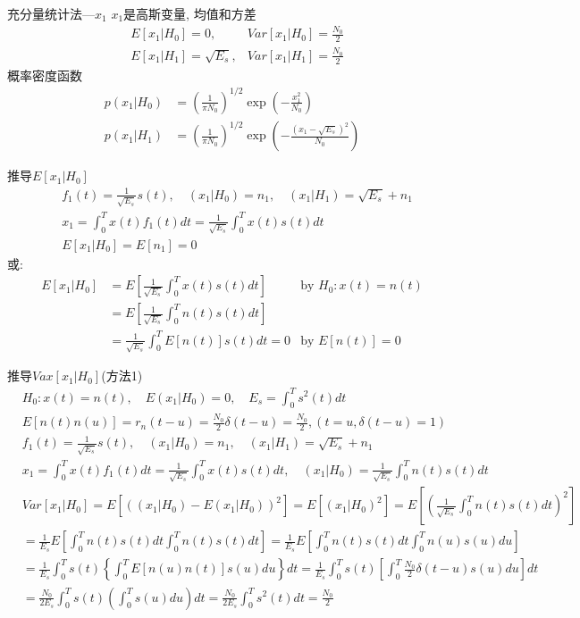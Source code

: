 \begin{frame}{充分量统计法---$x_1$}
$x_1$是高斯变量, 均值和方差
\begin{align*}
&E[x_1|H_0]=0,&Var[x_1|H_0]=\frac{N_0}{2}\\
&E[x_1|H_1]=\sqrt{E_s},&Var[x_1|H_1]=\frac{N_0}{2}
\end{align*}
概率密度函数
\begin{align*}
p(x_1|H_0)&=\left(\frac{1}{\pi N_0}\right)^{1/2}\exp\left(-\frac{x_1^2}{N_0}\right)\\
p(x_1|H_1)&=\left(\frac{1}{\pi N_0}\right)^{1/2}\exp\left(-\frac{(x_1-\sqrt{E_s})^2}{N_0}\right)
\end{align*}
\end{frame}

\begin{frame}[shrink]{推导$E[x_1|H_0]$}
\begin{align*}
&f_1(t)=\frac{1}{\sqrt{E_s}}s(t),\quad (x_1|H_0)=n_1,\quad (x_1|H_1)=\sqrt{E_s}+n_1\\ &x_1=\int_{0}^{T}x(t)f_1(t)dt=\frac{1}{\sqrt{E_s}}\int_{0}^{T}x(t)s(t)dt\\
&E[x_1|H_0]=E[n_1]=0
\end{align*}
或:
\begin{align*}
E[x_1|H_0]&=E\left[\frac{1}{\sqrt{E_s}}\int_{0}^{T}x(t)s(t)dt\right] &\text{by }H_0: x(t)=n(t)\\
&=E\left[\frac{1}{\sqrt{E_s}}\int_{0}^{T}n(t)s(t)dt\right]&\\
&=\frac{1}{\sqrt{E_s}}\int_{0}^{T}E[n(t)]s(t)dt=0 &\text{by }E[n(t)]=0
\end{align*}
\end{frame}

\begin{frame}[shrink]{推导$Vax[x_1|H_0]$(方法1)}
\begin{align*}
&H_0:x(t)=n(t),\quad E(x_1|H_0)=0,\quad E_s=\int_{0}^{T}s^2(t)dt\\
&E[n(t)n(u)]=r_n(t-u)=\frac{N_0}{2}\delta(t-u)=\frac{N_0}{2},(t=u,\delta(t-u)=1)\\
&f_1(t)=\frac{1}{\sqrt{E_s}}s(t),\quad (x_1|H_0)=n_1,\quad (x_1|H_1)=\sqrt{E_s}+n_1\\ &x_1=\int_{0}^{T}x(t)f_1(t)dt=\frac{1}{\sqrt{E_s}}\int_{0}^{T}x(t)s(t)dt,\quad (x_1|H_0)=\frac{1}{\sqrt{E_s}}\int_{0}^{T}n(t)s(t)dt
\end{align*}
\begin{align*}
&Var[x_1|H_0]=E[((x_1|H_0)-E(x_1|H_0))^2]=E[(x_1|H_0)^2]=E\left[\left(\frac{1}{\sqrt{E_s}}\int_{0}^{T}n(t)s(t)dt\right)^2\right]\\
&=\frac{1}{E_s}E\left[\int_{0}^{T}n(t)s(t)dt\int_{0}^{T}n(t)s(t)dt\right]=\frac{1}{E_s}E\left[\int_{0}^{T}n(t)s(t)dt\int_{0}^{T}n(u)s(u)du\right]\\
&=\frac{1}{E_s}\int_{0}^{T}s(t)\left\{\int_{0}^{T}E[n(u)n(t)]s(u)du\right\}dt=\frac{1}{E_s}\int_{0}^{T}s(t)\left[\int_{0}^{T}\frac{N_0}{2}\delta(t-u)s(u)du\right]dt\\
&=\frac{N_0}{2E_s}\int_{0}^{T}s(t)\left(\int_{0}^{T}s(u)du\right)dt=\frac{N_0}{2E_s}\int_{0}^{T}s^2(t)dt=\frac{N_0}{2}
\end{align*}
\end{frame}

